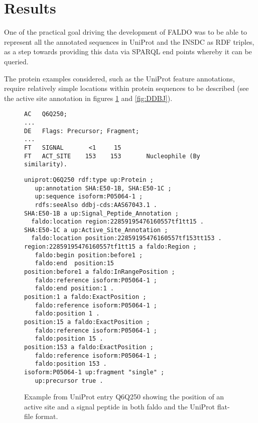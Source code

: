 \section*{Results}
One of the practical goal driving the development of FALDO was to be able
to represent all the annotated sequences in UniProt and the INSDC as RDF
triples, as a step towards providing this data via SPARQL end points whereby
it can be queried.

The protein examples considered, such as the UniProt feature annotations,
require relatively simple locations within protein sequences to be described (see the active site annotation in figures \ref{fig:UniProt} and \ref{fig:DDBJ}).

\begin{figure}
\begin{shaded}
\begin{verbatim}
AC   Q6Q250;
...
DE   Flags: Precursor; Fragment;
...
FT   SIGNAL       <1     15
FT   ACT_SITE    153    153       Nucleophile (By similarity).
\end{verbatim}
\begin{verbatim}
uniprot:Q6Q250 rdf:type up:Protein ;
   up:annotation SHA:E50-1B, SHA:E50-1C ;
   up:sequence isoform:P05064-1 ;
   rdfs:seeAlso ddbj-cds:AAS67043.1 .
SHA:E50-1B a up:Signal_Peptide_Annotation ;
  faldo:location region:22859195476160557tf1tt15 .
SHA:E50-1C a up:Active_Site_Annotation ;
  faldo:location position:22859195476160557tf153tt153 .
region:22859195476160557tf1tt15 a faldo:Region ;
   faldo:begin position:before1 ;
   faldo:end  position:15
position:before1 a faldo:InRangePosition ;
   faldo:reference isoform:P05064-1 ;
   faldo:end position:1 . 
position:1 a faldo:ExactPosition ;
   faldo:reference isoform:P05064-1 ;
   faldo:position 1 .
position:15 a faldo:ExactPosition ;
   faldo:reference isoform:P05064-1 ;
   faldo:position 15 .   
position:153 a faldo:ExactPosition ;
   faldo:reference isoform:P05064-1 ;
   faldo:position 153 .
isoform:P05064-1 up:fragment "single" ;
   up:precursor true .
\end{verbatim}
\end{shaded}
\caption{Example from UniProt entry Q6Q250 showing the position of an active site and a signal peptide in both faldo and the UniProt flat-file format.}
\label{fig:UniProt}
\end{figure}
